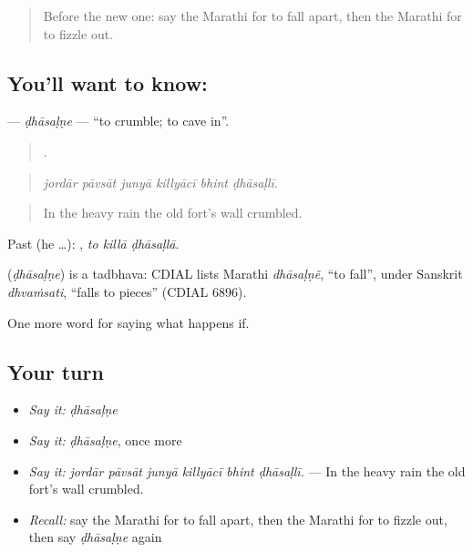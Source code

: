 \label{lesson:MR-C552-dhasalne}



\begin{quote}
Before the new one: say the Marathi for to fall apart, then the Marathi for to fizzle out.
\end{quote}

\subsection*{You'll want to know: }
\textbf{} — \emph{ḍhāsaḷṇe} — \textquotedblleft{}to crumble; to cave in\textquotedblright{}.

\begin{quote}
     .
\end{quote}

\begin{quote}
\emph{jordār pāvsāt junyā killyācī bhint ḍhāsaḷlī.}
\end{quote}

\begin{quote}
In the heavy rain the old fort's wall crumbled.
\end{quote}

Past (he …):   , \emph{to killā ḍhāsaḷlā}.

\begin{cousinweb}
\textbf{} (\emph{ḍhāsaḷṇe}) is a tadbhava: CDIAL lists Marathi \emph{dhāsaḷṇẽ}, \textquotedblleft{}to fall\textquotedblright{}, under Sanskrit \emph{dhvaṁsati}, \textquotedblleft{}falls to pieces\textquotedblright{} (CDIAL 6896).
\end{cousinweb}

\begin{grammarlens}[title={What you've built}]
One more word for saying what happens if.
\end{grammarlens}

\subsection*{Your turn}
\begin{itemize}
\raggedright
  \item \emph{Say it:} \emph{ḍhāsaḷṇe}
  \item \emph{Say it:} \emph{ḍhāsaḷṇe}, once more
  \item \emph{Say it:} \emph{jordār pāvsāt junyā killyācī bhint ḍhāsaḷlī.} — In the heavy rain the old fort's wall crumbled.
  \item \emph{Recall:} say the Marathi for to fall apart, then the Marathi for to fizzle out, then say \emph{ḍhāsaḷṇe} again
\end{itemize}


